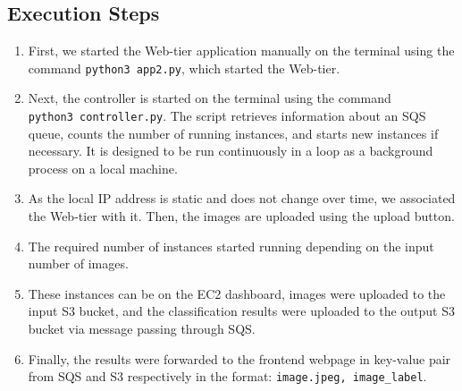 \documentclass[../main.tex]{subfiles}
\begin{document}
\subsection*{Execution Steps}

\begin{enumerate}
\item First, we started the Web-tier application manually on the terminal using the command \texttt{python3 app2.py}, which started the Web-tier.
\item Next, the controller is started on the terminal using the command\\ \verb|python3 controller.py|. The script retrieves information about an SQS queue, counts the number of running instances, and starts new instances if necessary. It is designed to be run continuously in a loop as a background process on a local machine.
\item As the local IP address is static and does not change over time, we associated the Web-tier with it. Then, the images are uploaded using the upload button.
\item The required number of instances started running depending on the input number of images.
\item These instances can be on the EC2 dashboard, images were uploaded to the input S3 bucket, and the classification results were uploaded to the output S3 bucket via message passing through SQS.
\item Finally, the results were forwarded to the frontend webpage in key-value pair from SQS and S3 respectively in the format: \verb|image.jpeg, image_label|.
\end{enumerate}
\end{document}
